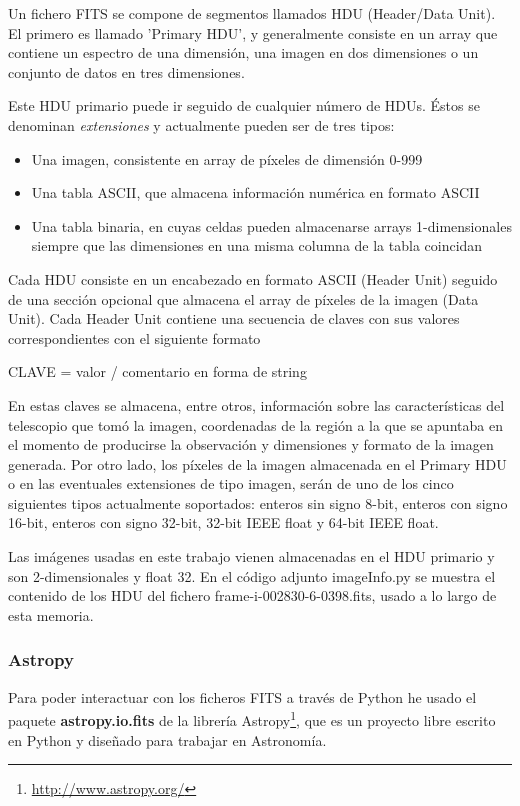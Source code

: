 \documentclass[a4paper,12pt]{article}
\begin{document}
Un fichero FITS se compone de segmentos llamados HDU (Header/Data Unit). El primero es llamado 'Primary HDU', y generalmente consiste en un array que contiene un espectro de una dimensión, una imagen en dos dimensiones o un conjunto de datos en tres dimensiones.

Este HDU primario puede ir seguido de cualquier número de HDUs. Éstos se denominan \textit{extensiones} y actualmente pueden ser de tres tipos:
\begin{itemize}
\item Una imagen, consistente en array de píxeles de dimensión 0-999
\item Una tabla ASCII, que almacena información numérica en formato ASCII
\item Una tabla binaria, en cuyas celdas pueden almacenarse arrays 1-dimensionales siempre que las dimensiones en una misma columna de la tabla coincidan
\end{itemize}
Cada HDU consiste en un encabezado en formato ASCII (Header Unit) seguido de una sección opcional que almacena el array de píxeles de la imagen (Data Unit). Cada Header Unit contiene una secuencia de claves con sus valores correspondientes con el siguiente formato
\begin{center}
CLAVE = valor / comentario en forma de string
\end{center}
En estas claves se almacena, entre otros, información sobre las características del telescopio que tomó la imagen, coordenadas de la región a la que se apuntaba en el momento de producirse la observación y dimensiones y formato de la imagen generada.
Por otro lado, los píxeles de la imagen almacenada en el Primary HDU o en las eventuales extensiones de tipo imagen, serán de uno de los cinco siguientes tipos actualmente soportados: enteros sin signo 8-bit, enteros con signo 16-bit, enteros con signo 32-bit, 32-bit IEEE float y 64-bit IEEE float.

Las imágenes usadas en este trabajo vienen almacenadas en el HDU primario y son 2-dimensionales y float 32. En el código adjunto imageInfo.py se muestra el contenido de los HDU del fichero frame-i-002830-6-0398.fits, usado a lo largo de esta memoria.
\subsubsection{Astropy}
Para poder interactuar con los ficheros FITS a través de Python he usado el paquete \textbf{astropy.io.fits} de la librería Astropy\footnote{\url{http://www.astropy.org/}}, que es un proyecto libre escrito en Python y diseñado para trabajar en Astronomía.
\end{document}

